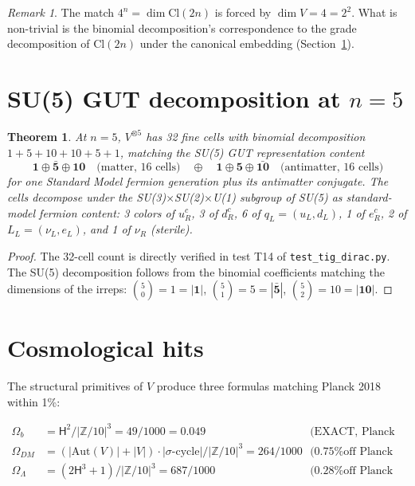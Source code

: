 \documentclass[11pt]{amsart}
\theoremstyle{plain}
\newtheorem{theorem}{Theorem}[section]
\theoremstyle{definition}
\theoremstyle{remark}
\newtheorem*{remark}{Remark}
\newcommand{\Z}{\mathbb{Z}}
\newcommand{\Cl}{\mathrm{Cl}}
\newcommand{\Aut}{\mathrm{Aut}}
\newcommand{\HARMONY}{\mathsf{H}}
\begin{document}
\begin{remark}
The match $4^n = \dim \Cl(2n)$ is forced by $\dim V = 4 = 2^2$. What is
non-trivial is the binomial decomposition's correspondence to the grade
decomposition of $\Cl(2n)$ under the canonical embedding (Section~\ref{sec:su5}).
\end{remark}

\section{SU(5) GUT decomposition at $n=5$}
\label{sec:su5}

\begin{theorem}\label{thm:su5}
At $n=5$, $V^{\otimes 5}$ has 32 fine cells with binomial decomposition
$1 + 5 + 10 + 10 + 5 + 1$, matching the SU(5) GUT representation content
\[
\mathbf{1} \oplus \bar{\mathbf{5}} \oplus \mathbf{10} \quad \text{(matter, 16 cells)}
\quad \oplus \quad \mathbf{1} \oplus \mathbf{5} \oplus \bar{\mathbf{10}} \quad \text{(antimatter, 16 cells)}
\]
for one Standard Model fermion generation plus its antimatter conjugate.
The cells decompose under the SU(3)$\times$SU(2)$\times$U(1) subgroup of
SU(5) as standard-model fermion content: 3 colors of $u_R^c$, 3 of
$d_R^c$, 6 of $q_L = (u_L, d_L)$, 1 of $e_R^c$, 2 of $L_L = (\nu_L, e_L)$, and
1 of $\nu_R$ (sterile).
\end{theorem}

\begin{proof}
The 32-cell count is directly verified in test T14 of
\texttt{test\_tig\_dirac.py}. The SU(5) decomposition follows from the
binomial coefficients matching the dimensions of the irreps:
$\binom{5}{0}=1=|\mathbf{1}|$, $\binom{5}{1}=5=|\bar{\mathbf{5}}|$,
$\binom{5}{2}=10=|\mathbf{10}|$.
\end{proof}

\section{Cosmological hits}
\label{sec:cosmology}

The structural primitives of $V$ produce three formulas matching Planck 2018
within 1\%:

\begin{align}
\Omega_b &= \HARMONY^2 / |\Z/10|^3 = 49/1000 = 0.049 & \text{(EXACT, Planck 0.0489)} \\
\Omega_{DM} &= (|\Aut(V)|+|V|)\cdot|\sigma\text{-cycle}|/|\Z/10|^3 = 264/1000 & \text{(0.75\% off Planck 0.2607)} \\
\Omega_\Lambda &= (2\HARMONY^3+1)/|\Z/10|^3 = 687/1000 & \text{(0.28\% off Planck 0.6889)}
\end{align}
\end{document}
